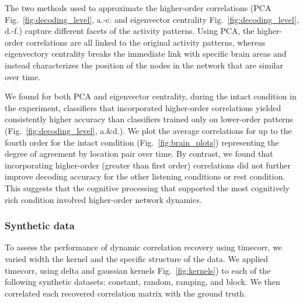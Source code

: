 The two methods used to approximate the higher-order correlations (PCA Fig.~\ref{fig:decoding_level},  a.-c. and eigenvector
centrality Fig.~\ref{fig:decoding_level},  d.-f.) capture different
facets of the activity patterns.  Using PCA, the higher-order
correlations are all linked to the original activity patterns, whereas
eigenvectory centrality breaks the immediate link with specific brain
areas and instead characterizes the position of the nodes in the
network that are similar over time.

We found for both PCA and eigenvector centrality, during the intact
condition in the experiment, classifiers that incorporated
higher-order correlations yielded consistently higher accuracy than
classifiers trained only on lower-order patterns
(Fig.~\ref{fig:decoding_level}, a.\&d.).  We plot the average
correlations for up to the fourth order for the intact condition
(Fig.~\ref{fig:brain_plots}) representing the degree of agreement by
location pair over time.  By contrast, we found that incorporating
higher-order (greater than first order) correlations did not further
improve decoding accuracy for the other listening conditions or rest
condition.  This suggests that the cognitive processing that supported
the most cognitively rich condition involved higher-order network
dynamics.










\subsubsection*{Synthetic data}



To assess the performance of dynamic correlation recovery using
timecorr, we varied width the kernel and the specific structure of the
data. We applied timecorr, using delta and gaussian kernels
Fig.~\ref{fig:kernels}) to each of the following  
synthetic datasets: constant, random, ramping, and block.  We then correlated each recovered
correlation matrix with the ground truth. 

